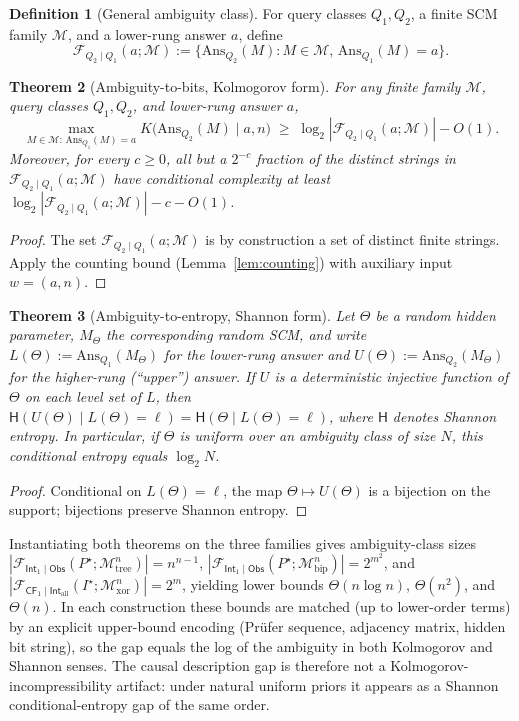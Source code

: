 \documentclass{article}
\theoremstyle{plain}
\newtheorem{theorem}{Theorem}[section]
\theoremstyle{definition}
\newtheorem{definition}[theorem]{Definition}
\newcommand{\calM}{\mathcal{M}}
\newcommand{\calF}{\mathcal{F}}
\newcommand{\Obs}{\mathsf{Obs}}
\newcommand{\Int}{\mathsf{Int}}
\newcommand{\CF}{\mathsf{CF}}
\newcommand{\Ans}{\mathrm{Ans}}
\begin{document}
\begin{definition}[General ambiguity class]
\label{def:gen-ambiguity}
For query classes $Q_1, Q_2$, a finite SCM family $\calM$, and a lower-rung answer $a$, define
\[
    \calF_{Q_2 \mid Q_1}(a; \calM) := \{\Ans_{Q_2}(M) : M \in \calM,\, \Ans_{Q_1}(M) = a\}.
\]
\end{definition}

\begin{theorem}[Ambiguity-to-bits, Kolmogorov form]
\label{thm:ambiguity-bits}
For any finite family $\calM$, query classes $Q_1, Q_2$, and lower-rung answer $a$,
\[
    \max_{M \in \calM:\, \Ans_{Q_1}(M) = a} K\!\bigl(\Ans_{Q_2}(M) \mid a, n\bigr) \;\geq\; \log_2 |\calF_{Q_2 \mid Q_1}(a; \calM)| - O(1).
\]
Moreover, for every $c \geq 0$, all but a $2^{-c}$ fraction of the distinct strings in $\calF_{Q_2 \mid Q_1}(a; \calM)$ have conditional complexity at least $\log_2 |\calF_{Q_2 \mid Q_1}(a; \calM)| - c - O(1)$.
\end{theorem}

\begin{proof}
The set $\calF_{Q_2 \mid Q_1}(a; \calM)$ is by construction a set of distinct finite strings. Apply the counting bound (Lemma~\ref{lem:counting}) with auxiliary input $w = (a, n)$.
\end{proof}

\begin{theorem}[Ambiguity-to-entropy, Shannon form]
\label{thm:ambiguity-entropy}
Let $\Theta$ be a random hidden parameter, $M_\Theta$ the corresponding random SCM, and write $L(\Theta) := \Ans_{Q_1}(M_\Theta)$ for the lower-rung answer and $U(\Theta) := \Ans_{Q_2}(M_\Theta)$ for the higher-rung (``upper'') answer. If $U$ is a deterministic injective function of $\Theta$ on each level set of $L$, then $\mathsf{H}(U(\Theta) \mid L(\Theta) = \ell) = \mathsf{H}(\Theta \mid L(\Theta) = \ell)$, where $\mathsf{H}$ denotes Shannon entropy. In particular, if $\Theta$ is uniform over an ambiguity class of size $N$, this conditional entropy equals $\log_2 N$.
\end{theorem}

\begin{proof}
Conditional on $L(\Theta) = \ell$, the map $\Theta \mapsto U(\Theta)$ is a bijection on the support; bijections preserve Shannon entropy.
\end{proof}

Instantiating both theorems on the three families gives ambiguity-class sizes $|\calF_{\Int_1 \mid \Obs}(P^\star; \calM_{\mathrm{tree}}^n)| = n^{n-1}$, $|\calF_{\Int_1 \mid \Obs}(P^\star; \calM_{\mathrm{bip}}^n)| = 2^{m^2}$, and $|\calF_{\CF_1 \mid \Int_{\mathrm{all}}}(I^\star; \calM_{\mathrm{xor}}^n)| = 2^m$, yielding lower bounds $\Theta(n \log n)$, $\Theta(n^2)$, and $\Theta(n)$. In each construction these bounds are matched (up to lower-order terms) by an explicit upper-bound encoding (Pr\"ufer sequence, adjacency matrix, hidden bit string), so the gap equals the log of the ambiguity in both Kolmogorov and Shannon senses. The causal description gap is therefore not a Kolmogorov-incompressibility artifact: under natural uniform priors it appears as a Shannon conditional-entropy gap of the same order.
\end{document}
